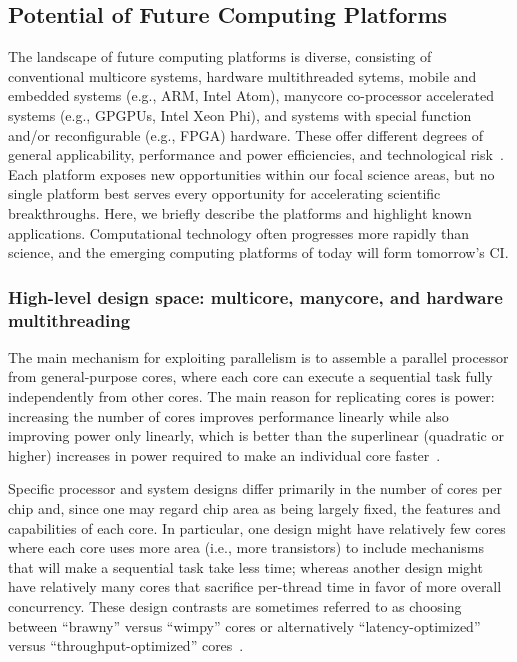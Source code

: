 \subsection{Potential of Future Computing Platforms}
The landscape of future computing platforms is diverse, consisting of conventional multicore systems, hardware multithreaded sytems, mobile and embedded systems (e.g., ARM, Intel Atom), manycore co-processor accelerated systems (e.g., GPGPUs, Intel Xeon Phi), and systems with special function and/or reconfigurable (e.g., FPGA) hardware.
These offer different degrees of general applicability,
performance and power efficiencies, and technological risk~\cite{Choi:2014bb}.
Each platform exposes new
opportunities within our focal science areas, but no single platform best serves every opportunity
for accelerating scientific breakthroughs. 
Here, we briefly describe the platforms and highlight
known applications. Computational technology often progresses more rapidly than science, and the
emerging computing platforms of today will form tomorrow's CI.

\subsubsection{High-level design space: multicore, manycore, and hardware multithreading}
The main mechanism for exploiting parallelism is to assemble a parallel processor from general-purpose cores, where each core can execute a sequential task fully independently from other cores.
The main reason for replicating cores is power:
increasing the number of cores improves performance linearly while also improving power only linearly, which is better than the superlinear (quadratic or higher) increases in power required to make an individual core faster~\cite{patterson:2010:spectrum}.

Specific processor and system designs differ primarily in the number of cores per chip and, since one may regard chip area as being largely fixed, the features and capabilities of each core.
In particular, one design might have relatively few cores where each core uses more area (i.e., more transistors) to include mechanisms that will make a sequential task take less time;
whereas another design might have relatively many cores that sacrifice per-thread time in favor of more overall concurrency.
These design contrasts are sometimes referred to as choosing between ``brawny'' versus ``wimpy'' cores or alternatively ``latency-optimized'' versus ``throughput-optimized'' cores~\cite{Holzle2010,Garland2010b}.

